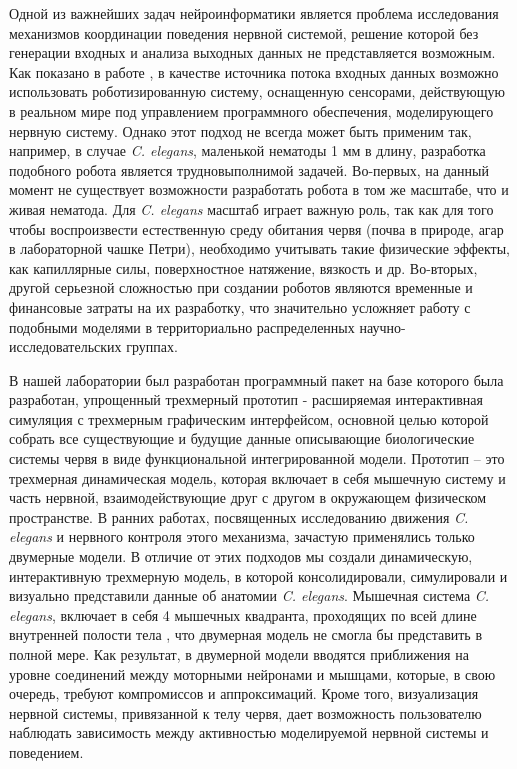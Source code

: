 Одной из важнейших задач нейроинформатики является проблема исследования механизмов координации поведения нервной системой, решение которой без генерации входных и анализа выходных данных не представляется возможным. Как показано в работе \cite {Krichmar2005}, в качестве источника потока входных данных возможно использовать роботизированную систему, оснащенную сенсорами, действующую в реальном мире под управлением программного обеспечения, моделирующего нервную систему. Однако этот подход не всегда может быть применим так, например, в случае \textit{C. elegans}, маленькой нематоды 1 мм в длину, разработка подобного робота является трудновыполнимой задачей. Во-первых, на данный момент не существует возможности разработать робота в том же масштабе, что и живая нематода. Для \textit{C. elegans} масштаб играет важную роль, так как для того чтобы воспроизвести естественную среду обитания червя (почва в природе, агар в лабораторной чашке Петри), необходимо учитывать такие физические эффекты, как капиллярные силы, поверхностное натяжение, вязкость  и др. Во-вторых, другой серьезной сложностью при создании роботов являются временные и финансовые затраты на их разработку, что значительно усложняет работу с подобными моделями в территориально распределенных научно-исследовательских группах.

В нашей лаборатории был разработан программный пакет \cite {Palyanov2012} на базе которого была разработан, упрощенный трехмерный прототип - расширяемая интерактивная симуляция с трехмерным графическим интерфейсом, основной целью которой собрать все существующие и будущие данные описывающие биологические системы червя в виде функциональной интегрированной модели. Прототип – это трехмерная динамическая модель, которая включает в себя мышечную систему и часть нервной, взаимодействующие друг с другом в окружающем физическом пространстве. В ранних работах, посвященных исследованию движения \textit{C. elegans} и нервного контроля этого механизма, зачастую применялись только двумерные модели. В отличие от этих подходов мы создали динамическую, интерактивную трехмерную модель, в которой консолидировали,  симулировали и визуально представили данные об анатомии \textit{C. elegans}. Мышечная система \textit{C. elegans}, включает в себя 4 мышечных квадранта, проходящих по всей длине внутренней полости тела \cite {White1986}, что двумерная модель не смогла бы представить в полной мере. Как результат, в двумерной модели вводятся приближения на уровне соединений между моторными нейронами и мышцами, которые, в свою очередь, требуют компромиссов и аппроксимаций. Кроме того, визуализация нервной системы, привязанной к телу червя, дает возможность пользователю наблюдать зависимость между активностью моделируемой нервной системы и поведением.

